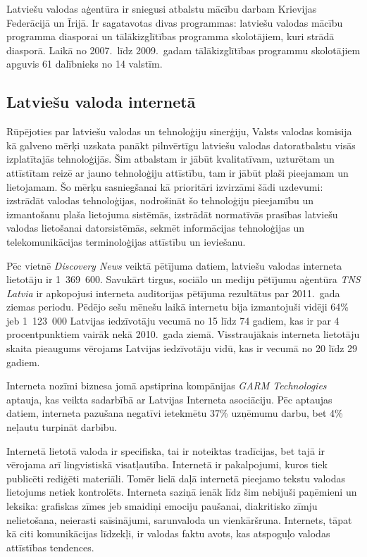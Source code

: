 \begin{multicols}{2}
Latviešu valodas aģentūra ir sniegusi atbalstu mācību darbam Krievijas Federācijā un Īrijā. 
Ir sagatavotas divas programmas: latviešu valodas mācību programma diasporai un tālākizglītības programma skolotājiem, kuri strādā diasporā. 
Laikā no 2007.~līdz 2009.~gadam tālākizglītības programmu skolotājiem apguvis 61 dalībnieks no 14 valstīm.

\subsection{Latviešu valoda internetā}

Rūpējoties par latviešu valodas un tehnoloģiju sinerģiju, Valsts valodas komisija kā galveno mērķi uzskata panākt pilnvērtīgu latviešu valodas datoratbalstu visās izplatītajās tehnoloģijās. 
Šim atbalstam ir jābūt kvalitatīvam, uzturētam un attīstītam reizē ar jauno tehnoloģiju attīstību, tam ir jābūt plaši pieejamam un lietojamam. 
Šo mērķu sasniegšanai kā prioritāri izvirzāmi šādi uzdevumi: izstrādāt valodas tehnoloģijas, nodrošināt šo tehnoloģiju pieejamību un izmantošanu plaša lietojuma sistēmās, izstrādāt normatīvās prasības latviešu valodas lietošanai datorsistēmās, sekmēt informācijas tehnoloģijas un telekomunikācijas terminoloģijas attīstību un ieviešanu.


Pēc vietnē \textit{Discovery News} veiktā pētījuma datiem, latviešu valodas interneta lietotāju ir 1~369~600.
Savukārt tirgus, sociālo un mediju pētījumu aģentūra \textit{TNS Latvia} ir apkopojusi interneta auditorijas pētījuma rezultātus par 2011.~gada ziemas periodu.
Pēdējo sešu mēnešu laikā internetu bija izmantojuši vidēji 64\%  jeb 1~123~000 Latvijas iedzīvotāju vecumā no 15 līdz 74 gadiem, kas ir par 4 procentpunktiem vairāk nekā 2010.~gada ziemā. 
Visstraujākais interneta lietotāju skaita pieaugums vērojams Latvijas iedzīvotāju vidū, kas ir vecumā no 20 līdz 29 gadiem.

Interneta nozīmi biznesa jomā apstiprina kompānijas \textit{GARM Technologies} aptauja, kas veikta sadarbībā ar Latvijas Interneta asociāciju. 
Pēc aptaujas datiem, interneta pazušana negatīvi ietekmētu 37\% uzņēmumu darbu, bet 4\% neļautu turpināt darbību.

Internetā lietotā valoda ir specifiska, tai ir noteiktas tradīcijas, bet tajā ir vērojama arī lingvistiskā visatļautība. 
Internetā ir pakalpojumi, kuros tiek publicēti rediģēti materiāli. 
Tomēr lielā daļā internetā pieejamo tekstu valodas lietojums netiek kontrolēts. 
Interneta saziņā ienāk līdz šim nebijuši paņēmieni un leksika: grafiskas zīmes jeb smaidiņi emociju pau\-šanai, diakritisko zīmju nelietošana, neierasti saīsinājumi, sarunvaloda un vienkāršruna. 
Internets, tāpat kā citi komunikācijas līdzekļi, ir valodas faktu avots, kas atspoguļo valodas attīstības tendences.


\end{multicols}
